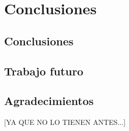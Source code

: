 \chapter{Conclusiones}

\section{Conclusiones}

\section{Trabajo futuro}

\section{Agradecimientos}
[YA QUE NO LO TIENEN ANTES...]